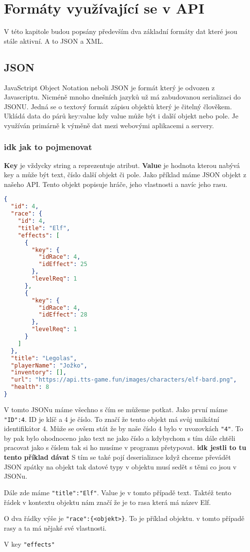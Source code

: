 \chapter{Formáty využívající se v API}
V této kapitole budou popsány především dva základní formáty dat které jsou stále aktivní. A to JSON a XML.

\section{JSON}
JavaSctript Object Notation neboli JSON je formát který je odvozen z Javascriptu. Nicméně mnoho dnešních jazyků už má zabudovanou serializaci do JSONU. Jedná se o textový formát zápisu objektů který je čitelný člověkem. Ukládá data do párů key:value kdy value může být i další objekt nebo pole. Je využíván primárně k výměně dat mezi webovými aplikacemi a servery.

\subsection{idk jak to pojmenovat}
\textbf{Key} je vždycky string a reprezentuje atribut. \textbf{Value} je hodnota kterou nabývá key a může být text, číslo další objekt či pole. Jako příklad máme JSON objekt z našeho API. Tento objekt popisuje hráče, jeho vlastnosti a navíc jeho rasu.
\begin{lstlisting}[language=json, caption=Příklad JSON dokumentu]
{
  "id": 4,
  "race": {
    "id": 4,
    "title": "Elf",
    "effects": [
      {
        "key": {
          "idRace": 4,
          "idEffect": 25
        },
        "levelReq": 1
      },
      {
        "key": {
          "idRace": 4,
          "idEffect": 28
        },
        "levelReq": 1
      }
    ]
  },
  "title": "Legolas",
  "playerName": "Jožko",
  "inventory": [],
  "url": "https://api.tts-game.fun/images/characters/elf-bard.png",
  "health": 8
}
\end{lstlisting}

V tomto JSONu máme všechno s čím se můžeme potkat. Jako první máme \verb|"ID":4|. ID je klíč a 4 je číslo. To značí že tento objekt má svůj unikátní identifikátor 4. Může se ovšem stát že by naše číslo 4 bylo v uvozovkách \verb|"4"|. To by pak bylo ohodnoceno jako text ne jako číslo a kdybychom s tím dále chtěli pracovat jako s číslem tak si ho musíme v programu přetypovat. \textbf{idk jestli to tu tento příklad dávat }S tím se také pojí deserializace když chceme převádět JSON zpátky na objekt tak datové typy v objektu musí sedět s těmi co jsou v JSONu.

Dále zde máme \verb|"title":"Elf"|. Value je v tomto případě text. Taktéž tento řádek v kontextu objektu nám značí že je to rasa která má název Elf.

O dva řádky výše je \verb|"race":{<objekt>}|. To je příklad objektu. v tomto případě rasy a ta má nějaké své vlastnosti.

V key \texttt{"effects"}


\endinput